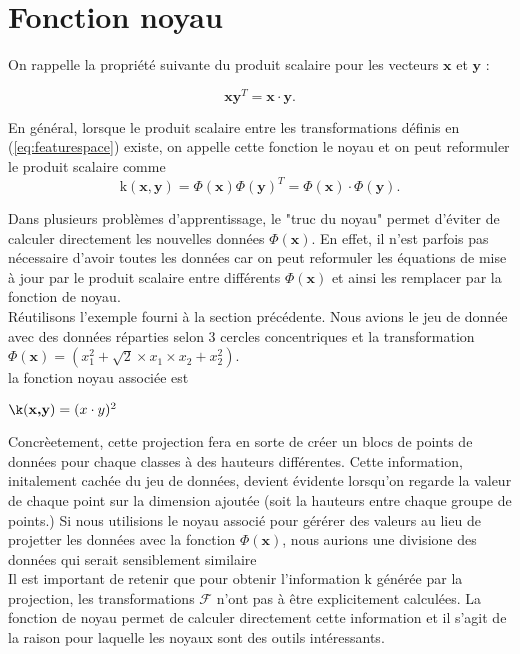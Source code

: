 \section{Fonction noyau}\label{sec:kernel}

On rappelle la propriété suivante du produit scalaire pour les vecteurs $\textbf{x}$ et $\textbf{y}$ : 

$$\textbf{x}\textbf{y}^T = \textbf{x} \cdot \textbf{y}.$$

En général, lorsque le produit scalaire entre les transformations définis en (\ref{eq:featurespace}) existe, on appelle cette fonction le noyau et on peut reformuler le produit scalaire comme
$$\textrm{k}(\textbf{x}, \textbf{y}) = \Phi(\textbf{x})\Phi(\textbf{y})^T = \Phi(\textbf{x})\cdot \Phi(\textbf{y}).$$

Dans plusieurs problèmes d'apprentissage, le "truc du noyau" permet d'éviter de calculer directement les nouvelles données $\Phi(\textbf{x})$. 
En effet, il n'est parfois pas nécessaire d'avoir toutes les données car on peut reformuler les équations de mise à jour par le produit scalaire 
entre différents $\Phi(\textbf{x})$ et ainsi les remplacer par la fonction de noyau. \\

Réutilisons l'exemple fourni à la section précédente. Nous avions le jeu de donnée avec des données réparties selon 3 cercles concentriques 
et la transformation $\Phi(\textbf{x})= (x_1^2 + \sqrt{2} \times x_1\times x_2 + x_2^2)$. \\ la fonction noyau associée est

$\k(\textbf{x,y})= (x \cdot y)^2$

Concrèetement, cette projection fera en sorte de créer un blocs de points de données pour chaque classes à des hauteurs différentes. Cette information, 
initalement cachée du jeu de données, devient évidente lorsqu'on regarde la valeur de chaque point sur la dimension ajoutée (soit la hauteurs entre chaque groupe de points.)
Si nous utilisions le noyau associé pour gérérer des valeurs au lieu de projetter les données avec la fonction $\Phi(\textbf{x})$,
nous aurions une divisione des données qui serait sensiblement similaire \\ 

Il est important de retenir que pour obtenir l’information $\textrm{k}$ générée par la projection, les transformations $\mathcal{F}$ n'ont pas à être explicitement calculées. 
La fonction de noyau permet de calculer directement cette information et il s’agit de la raison pour laquelle les noyaux sont des outils intéressants. \\

